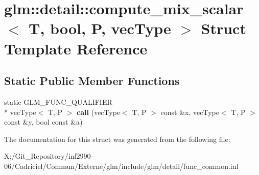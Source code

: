 \hypertarget{structglm_1_1detail_1_1compute__mix__scalar_3_01_t_00_01bool_00_01_p_00_01vec_type_01_4}{\section{glm\-:\-:detail\-:\-:compute\-\_\-mix\-\_\-scalar$<$ T, bool, P, vec\-Type $>$ Struct Template Reference}
\label{structglm_1_1detail_1_1compute__mix__scalar_3_01_t_00_01bool_00_01_p_00_01vec_type_01_4}
}
\subsection*{Static Public Member Functions}
\begin{DoxyCompactItemize}
\item 
\hypertarget{structglm_1_1detail_1_1compute__mix__scalar_3_01_t_00_01bool_00_01_p_00_01vec_type_01_4_a32b46dd2110b41d9c7b98fc90b9a88b1}{static G\-L\-M\-\_\-\-F\-U\-N\-C\-\_\-\-Q\-U\-A\-L\-I\-F\-I\-E\-R \\*
vec\-Type$<$ T, P $>$ {\bfseries call} (vec\-Type$<$ T, P $>$ const \&x, vec\-Type$<$ T, P $>$ const \&y, bool const \&a)}\label{structglm_1_1detail_1_1compute__mix__scalar_3_01_t_00_01bool_00_01_p_00_01vec_type_01_4_a32b46dd2110b41d9c7b98fc90b9a88b1}

\end{DoxyCompactItemize}


The documentation for this struct was generated from the following file\-:\begin{DoxyCompactItemize}
\item 
X\-:/\-Git\-\_\-\-Repository/inf2990-\/06/\-Cadriciel/\-Commun/\-Externe/glm/include/glm/detail/func\-\_\-common.\-inl\end{DoxyCompactItemize}
